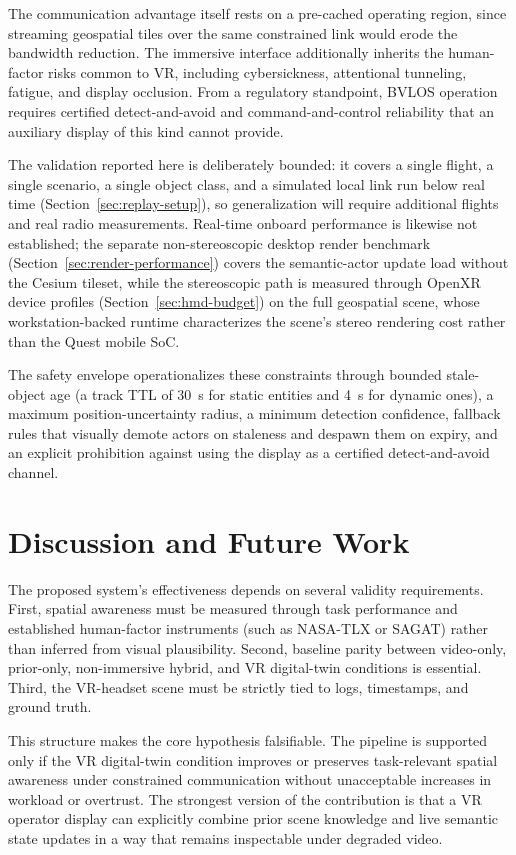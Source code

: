 \documentclass[fleqn]{VRIH2025}
\begin{document}
The communication advantage itself rests on a pre-cached operating region, since streaming geospatial tiles over the same constrained link would erode the bandwidth reduction. The immersive interface additionally inherits the human-factor risks common to VR, including cybersickness, attentional tunneling, fatigue, and display occlusion. From a regulatory standpoint, BVLOS operation requires certified detect-and-avoid and command-and-control reliability that an auxiliary display of this kind cannot provide.

The validation reported here is deliberately bounded: it covers a single flight, a single scenario, a single object class, and a simulated local link run below real time (Section~\ref{sec:replay-setup}), so generalization will require additional flights and real radio measurements. Real-time onboard performance is likewise not established; the separate non-stereoscopic desktop render benchmark (Section~\ref{sec:render-performance}) covers the semantic-actor update load without the Cesium tileset, while the stereoscopic path is measured through OpenXR device profiles (Section~\ref{sec:hmd-budget}) on the full geospatial scene, whose workstation-backed runtime characterizes the scene's stereo rendering cost rather than the Quest mobile SoC.

The safety envelope operationalizes these constraints through bounded stale-object age (a track TTL of 30~s for static entities and 4~s for dynamic ones), a maximum position-uncertainty radius, a minimum detection confidence, fallback rules that visually demote actors on staleness and despawn them on expiry, and an explicit prohibition against using the display as a certified detect-and-avoid channel.

\section{Discussion and Future Work}
\label{sec:discussion}

The proposed system's effectiveness depends on several validity requirements. First, spatial awareness must be measured through task performance and established human-factor instruments (such as NASA-TLX or SAGAT) rather than inferred from visual plausibility. Second, baseline parity between video-only, prior-only, non-immersive hybrid, and VR digital-twin conditions is essential. Third, the VR-headset scene must be strictly tied to logs, timestamps, and ground truth.

This structure makes the core hypothesis falsifiable. The pipeline is supported only if the VR digital-twin condition improves or preserves task-relevant spatial awareness under constrained communication without unacceptable increases in workload or overtrust. The strongest version of the contribution is that a VR operator display can explicitly combine prior scene knowledge and live semantic state updates in a way that remains inspectable under degraded video.
\end{document}
